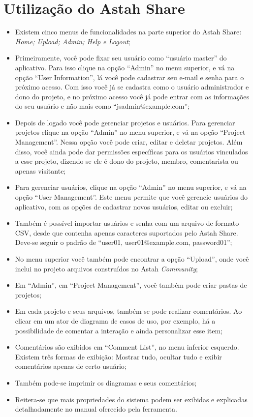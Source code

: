 \documentclass[12pt,a4paper]{article}
\begin{document}
\section{Utilização do Astah Share}

\begin{itemize}
\item Existem cinco menus de funcionalidades na parte superior do Astah Share: \textit{Home; Upload; Admin; Help e Logout};
\item Primeiramente, você pode fixar seu usuário como “usuário master” do aplicativo. Para isso clique na opção “Admin” no menu superior, e vá na opção “User Information”, lá você pode cadastrar seu e-mail e senha para o próximo acesso. Com isso você já se cadastra como o usuário administrador e dono do projeto, e no próximo acesso você já pode entrar com as informações do seu usuário e não mais como “jsadmin@example.com”;
\item Depois de logado você pode gerenciar projetos e usuários. Para gerenciar projetos clique na opção “Admin” no menu superior, e vá na opção “Project Management”. Nessa opção você pode criar, editar e deletar projetos. Além disso, você ainda pode dar permissões específicas para os usuários vinculados a esse projeto, dizendo se ele é dono do projeto, membro, comentarista ou apenas visitante;
\item Para gerenciar usuários, clique na opção “Admin” no menu superior, e vá na opção “User Management”. Este menu permite que você gerencie usuários do aplicativo, com as opções de cadastrar novos usuários, editar ou excluir;
\item Também é possível importar usuários e senha com um arquivo de formato CSV, desde que contenha apenas caracteres suportados pelo Astah Share. Deve-se seguir o padrão de “user01, user01@example.com, password01”;
\item No menu superior você também pode encontrar a opção “Upload”, onde você inclui no projeto arquivos construídos no Astah \textit{Community};
\item Em “Admin”, em “Project Management”, você também pode criar pastas de projetos;
\item Em cada projeto e seus arquivos, também se pode realizar comentários. Ao clicar em um ator de diagrama de casos de uso, por exemplo, há a possibilidade de comentar a interação e ainda personalizar esse item;
\item Comentários são exibidos em “Comment List”, no menu inferior esquerdo. Existem três formas de exibição: Mostrar tudo, ocultar tudo e exibir comentários apenas de certo usuário;
\item Também pode-se imprimir os diagramas e seus comentários;
\item Reitera-se que mais propriedades do sistema podem ser exibidas e explicadas detalhadamente no manual oferecido pela ferramenta.

\end{itemize}
\end{document}
